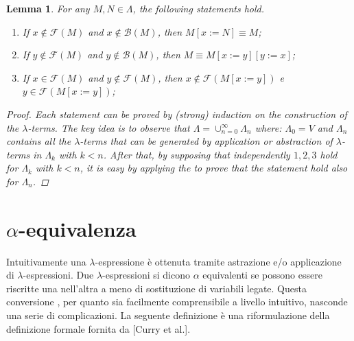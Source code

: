 \documentclass[a4paper,11pt]{article}
\newtheorem{lemma}{Lemma}
\theoremstyle{definition}
\newtheorem{defn}{Definition}
\newcommand{\FF}{\mathcal{F}}
\newcommand{\BB}{\mathcal{B}}
\begin{document}
\begin{lemma}
  For any $M,N\in\Lambda$, the following statements hold.
  \begin{enumerate}
    \item If $x\not\in\FF(M)$ and $x\not\in\BB(M)$, then $M[x:=N]\equiv M$;
    \item If $y\not\in\FF(M)$ and $y\not\in\BB(M)$, then $M\equiv M[x:=y][y:=x]$;
    \item If $x\in\FF(M)$ and $y\not\in\FF(M)$, then $x\not\in\FF(M[x:=y])$ e
      $y\in\FF(M[x:=y])$;
  \end{enumerate}
  \label{lem:sost}
  \begin{proof}
    Each statement can be proved by (strong) induction on the construction of the
    $\lambda$-terms. The key idea is to observe that $\Lambda =
    \cup_{n=0}^\infty\Lambda_n$ where: $\Lambda_0=V$ and $\Lambda_n$ contains all the
    $\lambda$-terms that can be generated by application or abstraction of $\lambda$-terms 
    in $\Lambda_k$ with $k<n$. After that, by supposing that independently $1,2,3$ hold
    for $\Lambda_k$ with $k<n$, it is easy by applying the 
    to prove that the statement hold also for $\Lambda_n$.
  \end{proof}
\end{lemma}

\section{$\alpha$-equivalenza}
Intuitivamente una $\lambda$-espressione è ottenuta tramite astrazione e/o
applicazione di $\lambda$-espressioni. Due $\lambda$-espressioni si dicono
$\alpha$ equivalenti se possono essere riscritte una nell'altra a meno di
sostituzione di variabili legate. Questa conversione , per quanto sia
facilmente comprensibile a livello intuitivo, nasconde una serie di
complicazioni. La seguente definizione è una riformulazione della definizione formale
fornita da [Curry et al.].


\end{document}
